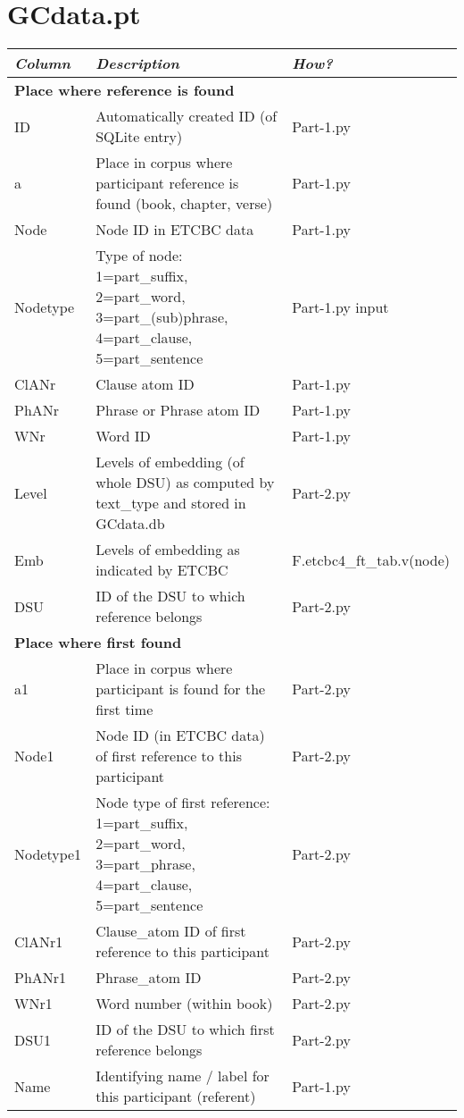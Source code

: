 \documentclass{article}
\newcommand{\fixme}[1]{\color{red} #1}
\begin{document}
\section{GCdata.pt}

\begin{longtable}{|l|p{}|l|}
\hline
\emph{Column} & \emph{Description} & \emph{How?}\\ \hline
\multicolumn{3}{|l|}{\bf{Place where reference is found}} \\ \hline
ID & Automatically created ID (of SQLite entry) & Part-1.py \\ \hline
a & Place in corpus where participant reference is found (book, chapter, verse) & Part-1.py \\ \hline
Node & Node ID in ETCBC data & Part-1.py \\ \hline
Nodetype & Type of node: 1=part\_suffix, 2=part\_word, 3=part\_(sub)phrase, 4=part\_clause, 5=part\_sentence & Part-1.py input\\ \hline
ClANr & Clause atom ID & Part-1.py \\ \hline
PhANr & Phrase or Phrase atom ID & Part-1.py \\ \hline
WNr & Word ID & Part-1.py \\ \hline
Level & Levels of embedding (of whole DSU) as computed by text\_type and stored in GCdata.db & Part-2.py\\ \hline
Emb & Levels of embedding as indicated by ETCBC & \fixme{F.etcbc4\_ft\_tab.v(node)} \\ \hline
DSU & ID of the DSU to which reference belongs & Part-2.py \\ \hline

\multicolumn{3}{|l|}{\bf{Place where first found}} \\ \hline

a1 & Place in corpus where participant is found for the first time & Part-2.py \\ \hline
Node1 & Node ID (in ETCBC data) of first reference to this participant & Part-2.py \\ \hline
Nodetype1 & Node type of first reference: 1=part\_suffix, 2=part\_word, 3=part\_phrase, 4=part\_clause, 5=part\_sentence & Part-2.py\\ \hline
ClANr1 & Clause\_atom ID of first reference to this participant & Part-2.py\\ \hline
PhANr1 & Phrase\_atom ID & Part-2.py\\ \hline
WNr1 & Word number (within book) & Part-2.py\\ \hline
DSU1 & ID of the DSU to which first reference belongs & Part-2.py\\ \hline
Name & Identifying name / label for this participant (referent) & Part-1.py \\ \hline


\end{longtable}
\end{document}
